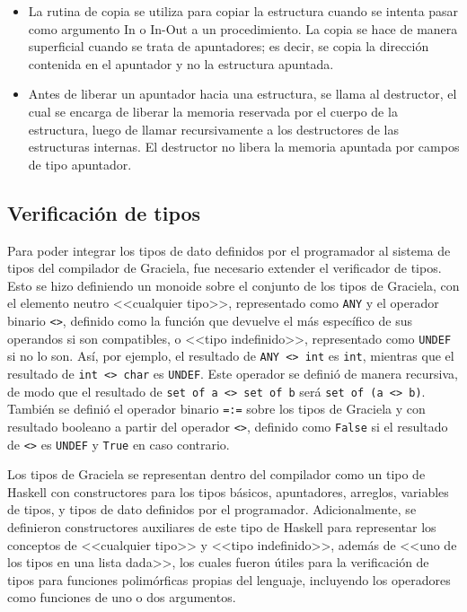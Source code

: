 {{\begin{itemize}
  \item La rutina de copia se utiliza para copiar la estructura cuando se
  intenta pasar como argumento In o In-Out a un procedimiento. La copia se hace
  de manera superficial cuando se trata de apuntadores; es decir, se copia la
  dirección contenida en el apuntador y no la estructura apuntada.

  \item Antes de liberar un apuntador hacia una estructura, se llama al
  destructor, el cual se encarga de liberar la memoria reservada por el cuerpo
  de la estructura, luego de llamar recursivamente a los destructores de las
  estructuras internas. El destructor no libera la memoria apuntada por campos
  de tipo apuntador.

\end{itemize}


\subsection{Verificación de tipos}

Para poder integrar los tipos de dato definidos por el programador al sistema
de tipos del compilador de Graciela, fue necesario extender el verificador de
tipos. Esto se hizo definiendo un monoide sobre el conjunto de los tipos de
Graciela, con el elemento neutro <<cualquier tipo>>, representado como
\texttt{ANY} y el operador binario \texttt{<>}, definido como la función que
devuelve el más específico de sus operandos si son compatibles, o <<tipo
indefinido>>, representado como \texttt{UNDEF} si no lo son. Así, por ejemplo,
el resultado de \texttt{ANY <>{} int} es \texttt{int}, mientras que el resultado
de \texttt{int <>{} char} es \texttt{UNDEF}. Este operador se definió de manera
recursiva, de modo que el resultado de \texttt{set of a <>{} set of b} será 
\texttt{set of (a <>{} b)}. También se definió el operador binario \texttt{=:=}
sobre los tipos de Graciela y con resultado booleano a partir del operador
\texttt{<>}, definido como \texttt{False} si el resultado de \texttt{<>} es
\texttt{UNDEF} y \texttt{True} en caso contrario.

Los tipos de Graciela se representan dentro del compilador como un
tipo de Haskell con constructores para los tipos básicos, apuntadores, arreglos,
variables de tipos, y tipos de dato definidos por el programador.
Adicionalmente, se definieron constructores auxiliares de este tipo de Haskell
para representar los conceptos de <<cualquier tipo>> y <<tipo indefinido>>,
además de <<uno de los tipos en una lista dada>>, los cuales fueron útiles para
la verificación de tipos para funciones polimórficas propias del lenguaje,
incluyendo los operadores como funciones de uno o dos argumentos.

}}
